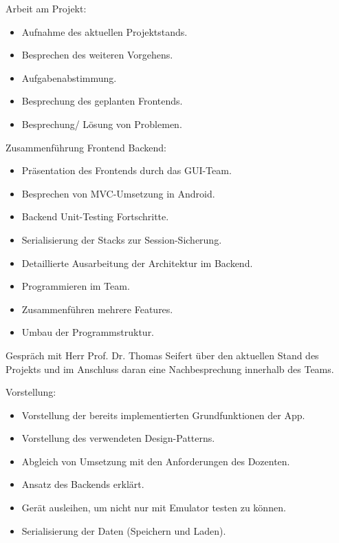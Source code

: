 Arbeit am Projekt:

\begin{itemize}
	\item Aufnahme des aktuellen Projektstands.
	\item Besprechen des weiteren Vorgehens.
	\item Aufgabenabstimmung.
	\item Besprechung des geplanten Frontends.
	\item Besprechung/ Lösung von Problemen.
\end{itemize}


Zusammenführung Frontend Backend:

\begin{itemize}
	\item Präsentation des Frontends durch das GUI-Team.
	\item Besprechen von MVC-Umsetzung in Android.
	\item Backend Unit-Testing Fortschritte.
	\item Serialisierung der Stacks zur Session-Sicherung.
\end{itemize}


\begin{itemize}
	\item Detaillierte Ausarbeitung der Architektur im Backend.
	\item Programmieren im Team. 
	\item Zusammenführen mehrere Features.
	\item Umbau der Programmstruktur.
\end{itemize}


Gespräch mit Herr Prof. Dr. Thomas Seifert über den aktuellen Stand des Projekts und im Anschluss daran eine Nachbesprechung innerhalb des Teams.

Vorstellung:

\begin{itemize}
	\item Vorstellung der bereits implementierten Grundfunktionen der App.
	\item Vorstellung des verwendeten Design-Patterns.
	\item Abgleich von Umsetzung mit den Anforderungen des Dozenten.
	\item Ansatz des Backends erklärt.
	\item Gerät ausleihen, um nicht nur mit Emulator testen zu können.
	\item Serialisierung der Daten (Speichern und Laden).
\end{itemize}

